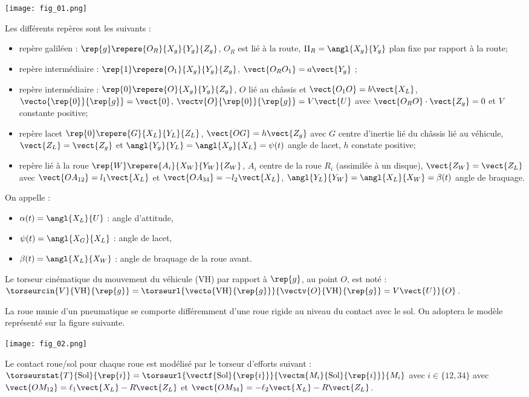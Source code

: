 \begin{multicols}{2}
\begin{center}
\texttt{[image: fig\_01.png]}
\end{center}

Les différents repères sont les suivants : 
\begin{itemize}
\item repère galiléen : $\rep{g} \repere{O_R}{X_g}{Y_g}{Z_g}$, $O_R$ est lié à la route, $\Pi_R = \angl{X_g}{Y_g}$ plan fixe par rapport à la route;
\item repère intermédiaire : $\rep{1} \repere{O_1}{X_g}{Y_g}{Z_g}$, $\vect{O_R O_1} = a \vect{Y_g}$ ;
\item repère intermédiaire : $\rep{0} \repere{O}{X_g}{Y_g}{Z_g}$, $O$ lié au châssis et $\vect{O_1 O} = b \vect{X_L}$, $\vecto{\rep{0}}{\rep{g}}=\vect{0}$, $\vectv{O}{\rep{0}}{\rep{g}}=V\vect{U}$ avec $\vect{O_R O}\cdot \vect{Z_g}=0$ 
et $V$ constante positive;
\item repère lacet $\rep{0} \repere{G}{X_L}{Y_L}{Z_L}$, $\vect{OG}=h\vect{Z_g}$ avec $G$ centre d'inertie lié du châssis  
lié au véhicule, $\vect{Z_L}=\vect{Z_g}$ et $\angl{Y_g}{Y_L}=\angl{X_g}{X_L}=\psi(t)$ angle de lacet, $h$ constate positive;
\item repère lié à la roue $\rep{W} \repere{A_i}{X_W}{Y_W}{Z_W}$, $A_i$ centre de la roue $R_i$ (assimilée à un disque), $\vect{Z_W}=\vect{Z_L}$ avec $\vect{OA_{12}}=l_1\vect{X_L}$ et $\vect{OA_{34}}=-l_2\vect{X_L}$, $\angl{Y_L}{Y_W}=\angl{X_L}{X_W}=\beta(t)$ angle de braquage.
\end{itemize}

On appelle :
\begin{itemize}
\item $\alpha(t)=\angl{X_L}{U}$ : angle d’attitude,
\item $\psi(t)=\angl{X_G}{X_L}$ : angle de lacet,
\item $\beta(t)=\angl{X_L}{X_W}$ : angle de braquage de la roue avant.
\end{itemize}
Le torseur cinématique du mouvement du véhicule (VH) par rapport à $\rep{g}$, au
point $O$, est noté :
$\torseurcin{V}{\text{VH}}{\rep{g}}=\torseurl{\vecto{\text{VH}}{\rep{g}}}{\vectv{O}{\text{VH}}{\rep{g}}=V\vect{U}}{O}$.

La roue munie d’un pneumatique se comporte différemment d’une roue rigide au niveau du contact avec le sol.
On adoptera le modèle représenté sur la figure suivante.

\begin{center}
\texttt{[image: fig\_02.png]}
\end{center}
Le contact roue/sol pour chaque roue est modélisé par le torseur d’efforts
suivant :
$\torseurstat{T}{\text{Sol}}{\rep{i}}=\torseurl{\vectf{\text{Sol}}{\rep{i}} }{\vectm{M_i}{\text{Sol}}{\rep{i}}}{M_i} $ avec  $i\in\{12,34\}$ avec $\vect{OM_{12}}=\ell_1\vect{X_L}-R\vect{Z_L}$ et $\vect{OM_{34}}=-\ell_2\vect{X_L}-R\vect{Z_L}$.



\end{multicols}
